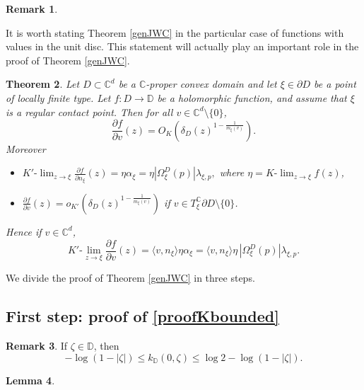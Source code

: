 \documentclass[11pt, reqno]{amsart}
\numberwithin{equation}{section}
\newtheorem{theorem}{Theorem}[section]
\newtheorem{lemma}[theorem]{Lemma}
\theoremstyle{definition}
\newtheorem{remark}[theorem]{Remark}
\newcommand{\C}{\mathbb{C}}
\newcommand{\D}{\mathbb{D}}
\begin{document}
{{{\begin{remark}
			
		\end{remark}
		It is worth stating Theorem \ref{genJWC} in the particular case of functions with values in the unit disc. This statement will actually play an important role in the proof of Theorem \ref{genJWC}.
		\begin{theorem}\label{JWC1}
			Let $D\subset\C^d$ be a $\C$-proper convex domain and let $\xi\in\partial D$ be a point of locally finite type.
			Let $f\colon D\to \D$ be a holomorphic function, and assume that $\xi$ is a regular contact point. 
			Then for all $v\in \C^d\setminus\{0\}$, $$ \frac{\partial f}{\partial v}(z)=O_{K}\left( \delta_D(z)^{1-\frac{1}{m_\xi(v)}}\right).$$ Moreover
			\begin{itemize}
				\item[(i)] $ K'\textrm{-}\lim_{z\to\xi} \frac{\partial f}{\partial n_\xi}(z)=\eta\alpha_\xi=\eta |\Omega^D_\xi(p)| \lambda_{\xi,p},$
				where $\eta= K\textrm{-}\lim_{z\to\xi}f(z)$,
				\item[(ii)] $\frac{\partial f}{\partial v}(z)=o_{K'}\left( \delta_D(z)^{1-\frac{1}{m_\xi(v)}}\right)$ if $v\in  T^\C_\xi\partial D\setminus\{0\}$.
			\end{itemize}
			Hence
			if $v\in \C^d$, 
			$$K'\textrm{-}\lim_{z\to\xi} \frac{\partial f}{\partial v}(z)=\langle v,n_\xi \rangle\eta\alpha_\xi=\langle v,n_\xi \rangle \eta \,|\Omega^D_\xi(p)| \lambda_{\xi,p}.$$
			
		\end{theorem}
		
		
		
		
		
		
		
		
		
		We divide the proof of Theorem \ref{genJWC} in three steps.
		\subsection{First step: proof of \eqref{proofKbounded}}
		
		
		
		\begin{remark} 
			If $\zeta\in \D$, then
			\begin{equation}\label{stimadisco}-\log(1-|\zeta|)\leq k_\D(0,\zeta)\leq \log2-\log(1-|\zeta|).
			\end{equation}
		\end{remark}
		
		
		\begin{lemma}\label{lemmadistanza}
			

\end{lemma}}}}
\end{document}
